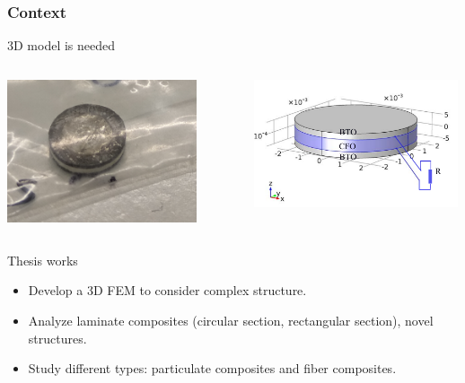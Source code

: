 \documentclass[compress]{beamer}
\begin{document}
\begin{frame}\frametitle{Context}
\vspace{-10.5pt}
\begin{alertblock}{3D model is needed}
\begin{columns}[totalwidth=\textwidth] 
   \begin{column}{.5\textwidth}
   \raggedleft
\includegraphics[width=0.83\textwidth]{Graphic/01_photoMEcircle.png}
	\end{column}
	\begin{column}{.5\textwidth}
	\includegraphics[width=0.99\textwidth]{Graphic/01_geoMEcircu.pdf}
	\end{column}
\end{columns}
\end{alertblock}
\begin{exampleblock}{Thesis works} 
  \begin{itemize}[label=$\bullet$, font=\small, leftmargin=*]
	\item Develop a 3D FEM to consider complex structure.
	\item Analyze laminate composites (circular section, rectangular section), novel structures.
	\item Study different types: particulate composites and fiber composites.
	\end{itemize}
\end{exampleblock}	
\end{frame}
\end{document}
